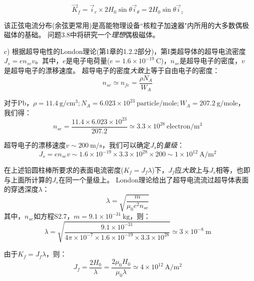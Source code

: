 \begin{equation*}
  \vec{K}_f=\vec{i}_r \times 2H_0\sin\theta \vec{i}_\theta=2H_0\sin\theta\vec{i}_z\tag{2.43}
\end{equation*}

该正弦电流分布(余弦更常用)是高能物理设备``核粒子加速器"内所用的大多数偶极磁体的基础。
问题3.8中将研究一个\textit{理想}偶极磁体。


c) 根据超导电性的London理论(第1章的1.2.2部分)，第I类超导体的超导电流密度$J_s=en_{se}v$。其中，$e$是电子电荷量($e=1.6\times 10^{-19}\ \mathrm{C}$)，$n_{se}$是超导电子的密度，$v$是超导电子的漂移速度。
超导电子的密度\textit{大致}上等于自由电子的密度：
\begin{equation*}
n_{se}\simeq n_{fe}=\frac{\rho N_A}{W_A} \tag{1.2}
\end{equation*}

对于Pb，$\rho=11.4\ \mathrm{g/cm^3};N_A=6.023\times 10^{23}\ \mathrm{particle/mole};W_A=207.2\ \mathrm{g/mole}$，我们得：
\begin{equation*}
n_{se}=\frac{11.4\times 6.023\times 10^{23}}{207.2} \simeq 3.3\times 10^{28}\ \mathrm{electron/m^3} \tag{S2.7}
\end{equation*}

超导电子的漂移速度$v\sim 200\ \mathrm{m/s}$，我们可以确定$J_s$的\textit{量级}：
\begin{equation*}
J_s=e n_{se} v\sim 1.6\times 10^{-19} \times 3.3\times 10^{28} \times 200 \sim 1\times 10^{12}\ \mathrm{A/m^2} 
\end{equation*}

在上述铅圆柱棒所要求的表面电流密度($K_f=J_f \lambda$)下，$J_f$应\textit{大致}上与$J_s$相等，也即与上面所计算的$J_s$在同一个量级上。
London理论给出了超导电流流过超导体表面的穿透深度$\lambda$：
\begin{equation*}
\lambda=\sqrt{\frac{m}{\mu_0 e^2 n_{se}}} \tag{1.1}
\end{equation*}
其中，$n_{se}$如方程S2.7，$m=9.1\times 10^{-31}\ \mathrm{kg}$，则：
\begin{equation*}
\lambda=\sqrt{\frac{9.1\times 10^{-31}}{4\pi \times 10^{-7}\times 1.6\times 10^{-19}\times 3.3\times 10^{28}}}\simeq 3\times 10^{-8}\ \mathrm{m}
\end{equation*}

由于$K_f=J_f\lambda$，则：
\begin{equation*}
J_f=\frac{2H_0}{\lambda}=\frac{2\mu_0 H_0}{\mu_0 \lambda}\simeq 4\times 10^{12} \ \mathrm{A/m^2}  \tag{S2.9}
\end{equation*}

